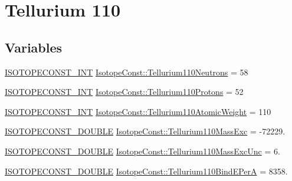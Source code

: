 \hypertarget{group___isotope_const-_tellurium-_te110}{}\section{Tellurium 110}
\label{group___isotope_const-_tellurium-_te110}
\subsection*{Variables}
\begin{DoxyCompactItemize}
\item 
\mbox{\hyperlink{group___isotope_const-_macros_ga5f18360b3e99483a35c32d789e62621c}{I\+S\+O\+T\+O\+P\+E\+C\+O\+N\+S\+T\+\_\+\+I\+NT}} \mbox{\hyperlink{group___isotope_const-_tellurium-_te110_gab9f16bbd9cf5065bfe90bfa3236f4d81}{Isotope\+Const\+::\+Tellurium110\+Neutrons}} = 58
\item 
\mbox{\hyperlink{group___isotope_const-_macros_ga5f18360b3e99483a35c32d789e62621c}{I\+S\+O\+T\+O\+P\+E\+C\+O\+N\+S\+T\+\_\+\+I\+NT}} \mbox{\hyperlink{group___isotope_const-_tellurium-_te110_ga9bd1bc17abc9a38879bed26940d9d3d1}{Isotope\+Const\+::\+Tellurium110\+Protons}} = 52
\item 
\mbox{\hyperlink{group___isotope_const-_macros_ga5f18360b3e99483a35c32d789e62621c}{I\+S\+O\+T\+O\+P\+E\+C\+O\+N\+S\+T\+\_\+\+I\+NT}} \mbox{\hyperlink{group___isotope_const-_tellurium-_te110_ga8fc372bff0a86bc6350757b571a3706d}{Isotope\+Const\+::\+Tellurium110\+Atomic\+Weight}} = 110
\item 
\mbox{\hyperlink{group___isotope_const-_macros_ga8f45a7272ce02c0b4c65c44636ed719a}{I\+S\+O\+T\+O\+P\+E\+C\+O\+N\+S\+T\+\_\+\+D\+O\+U\+B\+LE}} \mbox{\hyperlink{group___isotope_const-_tellurium-_te110_gae0901111dca2ad2dfcb688293b356b2f}{Isotope\+Const\+::\+Tellurium110\+Mass\+Exc}} = -\/72229.
\item 
\mbox{\hyperlink{group___isotope_const-_macros_ga8f45a7272ce02c0b4c65c44636ed719a}{I\+S\+O\+T\+O\+P\+E\+C\+O\+N\+S\+T\+\_\+\+D\+O\+U\+B\+LE}} \mbox{\hyperlink{group___isotope_const-_tellurium-_te110_ga1dced3cbc4257718af43a4cddcec8001}{Isotope\+Const\+::\+Tellurium110\+Mass\+Exc\+Unc}} = 6.
\item 
\mbox{\hyperlink{group___isotope_const-_macros_ga8f45a7272ce02c0b4c65c44636ed719a}{I\+S\+O\+T\+O\+P\+E\+C\+O\+N\+S\+T\+\_\+\+D\+O\+U\+B\+LE}} \mbox{\hyperlink{group___isotope_const-_tellurium-_te110_ga8d4cde31ad9630471e9764748f29382e}{Isotope\+Const\+::\+Tellurium110\+Bind\+E\+PerA}} = 8358.
\item 

\end{DoxyCompactItemize}
